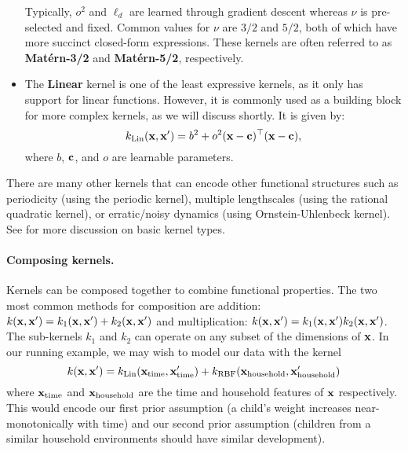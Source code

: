\begin{itemize}
    Typically, $o^2$ and $\ell_d$ are learned through gradient descent whereas $\nu$ is pre-selected and fixed.
    Common values for $\nu$ are $3/2$ and $5/2$, both of which have more succinct closed-form expressions.
    These kernels are often referred to as {\bf Mat\'ern-3/2} and {\bf Mat\'ern-5/2}, respectively.

  \item The {\bf Linear} kernel is one of the least expressive kernels, as it only has support for linear functions.
    However, it is commonly used as a building block for more complex kernels, as we will discuss shortly.
    It is given by:
    \[ k_\text{Lin} ( \mathbf{x}, \mathbf{x}' ) = b^2 + o^2 (\mathbf{x} - \mathbf{c})^\top (\mathbf{x} - \mathbf{c}), \]
    where $b$, $\mathbf{c}$, and $o$ are learnable parameters.
\end{itemize}
%
\noindent
There are many other kernels that can encode other functional structures such as periodicity (using the periodic kernel), multiple lengthscales (using the rational quadratic kernel), or erratic/noisy dynamics (using Ornstein-Uhlenbeck kernel).
See \cite{rasmussen2006gaussian} for more discussion on basic kernel types.

\paragraph{Composing kernels.}
Kernels can be composed together to combine functional properties.
The two most common methods for composition are addition: $k(\mathbf{x}, \mathbf{x}') = k_1(\mathbf{x}, \mathbf{x}') + k_2(\mathbf{x}, \mathbf{x}')$
and multiplication: $k(\mathbf{x}, \mathbf{x}') = k_1(\mathbf{x}, \mathbf{x}') k_2(\mathbf{x}, \mathbf{x}')$.
The sub-kernels $k_1$ and $k_2$ can operate on any subset of the dimensions of $\mathbf{x}$.
In our running example, we may wish to model our data with the kernel
%
\[ k(\mathbf{x}, \mathbf{x}') = k_\text{Lin}( \mathbf{x}_\text{time}, \mathbf{x}_\text{time}' ) + k_\text{RBF}( \mathbf{x}_\text{household}, \mathbf{x}_\text{household}' ) \]
%
where $\mathbf{x}_\text{time}$ and $\mathbf{x}_\text{household}$ are the time and household features of $\mathbf{x}$ respectively.
This would encode our first prior assumption (a child's weight increases near-monotonically with time)
and our second prior assumption (children from a similar household environments should have similar development).


